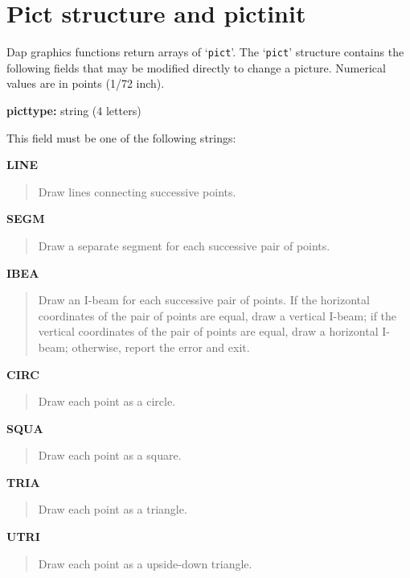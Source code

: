 \documentclass{book}
\renewcommand{\_}{\Texinfounderscore\discretionary{}{}{}}
\begin{document}
\section{{Pict structure and pict\_init}}
\label{anchor:Pict-structure}%

Dap graphics functions return arrays of `\texttt{pict}'.
%
%
The `\texttt{pict}' structure
contains the following fields that may be modified directly to change a picture.
Numerical values are in points (1/72 inch).

\noindent{}\textbf{pict\_type:} string (4 letters)
%
%

This field must be one of the following strings:

\textbf{LINE}
\begin{quote}
Draw lines connecting successive points.
\end{quote}
%

\textbf{SEGM}
\begin{quote}
Draw a separate segment for each successive pair of points.
\end{quote}
%
%

\textbf{IBEA}
\begin{quote}
Draw an I-beam for each successive pair of points.
If the horizontal coordinates of the pair of points are equal,
draw a vertical I-beam; if the vertical coordinates of the pair of points are equal,
draw a horizontal I-beam; otherwise, report the error and exit.
\end{quote}
%

\textbf{CIRC}
\begin{quote}
Draw each point as a circle.
\end{quote}
%
%

\textbf{SQUA}
\begin{quote}
Draw each point as a square.
\end{quote}
%

\textbf{TRIA}
\begin{quote}
Draw each point as a triangle.
\end{quote}
%

\textbf{UTRI}
\begin{quote}
Draw each point as a upside-down triangle.
\end{quote}
%
\end{document}
